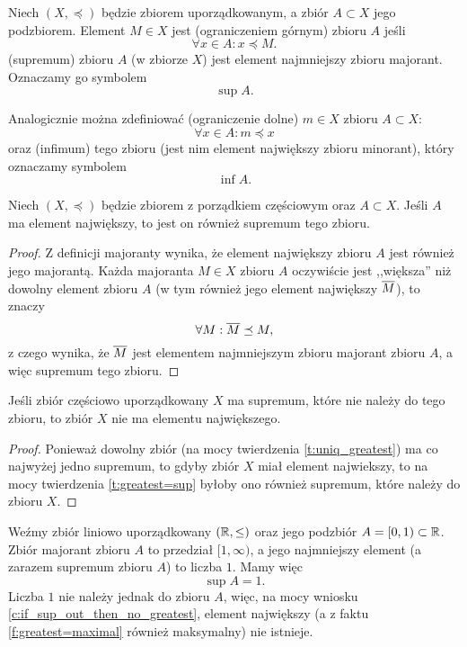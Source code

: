 \documentclass[11pt]{scrartcl}
\begin{document}
    Niech $(X, \preceq)$ będzie zbiorem uporządkowanym, a zbiór $A \subset X$ jego podzbiorem. Element $M \in X$ jest  (ograniczeniem górnym) zbioru $A$ jeśli
    $$ \forall x \in A : x \preceq M. $$
     (supremum) zbioru $A$ (w zbiorze $X$) jest element najmniejszy zbioru majorant. Oznaczamy go symbolem $$\sup A.$$

    \begin{remark}
        Analogicznie można zdefiniować  (ograniczenie dolne) $m \in X$ zbioru $A \subset X$:
        $$ \forall x \in A : m \preceq x $$
        oraz  (infimum) tego zbioru (jest nim element największy zbioru minorant), który oznaczamy symbolem $$\inf A.$$
    \end{remark}

    \begin{theorem}
        \label{t:greatest=sup}
        Niech $(X, \preceq)$ będzie zbiorem z porządkiem częściowym oraz $A \subset X$. Jeśli $A$ ma element największy, to jest on również supremum tego zbioru.
    \end{theorem}
    \begin{proof}
        Z definicji majoranty wynika, że element największy zbioru $A$ jest również jego majorantą. Każda majoranta $M \in X$ zbioru $A$ oczywiście jest ,,większa'' niż dowolny element zbioru $A$ (w tym również jego element największy $\overline{M}$), to znaczy
        $$ \forall M : \overline{M} \preceq M, $$
        z czego wynika, że $\overline{M}$ jest elementem najmniejszym zbioru majorant zbioru $A$, a więc supremum tego zbioru.
    \end{proof}

    \begin{corollary}
        \label{c:if_sup_out_then_no_greatest}
        Jeśli zbiór częściowo uporządkowany $X$ ma supremum, które nie należy do tego zbioru, to zbiór $X$ nie ma elementu największego.
    \end{corollary}
    \begin{proof}
        Ponieważ dowolny zbiór (na mocy twierdzenia \ref{t:uniq_greatest}) ma co najwyżej jedno supremum, to gdyby zbiór $X$ miał element najwiekszy, to na mocy twierdzenia \ref{t:greatest=sup} byłoby ono również supremum, które należy do zbioru $X$.
    \end{proof}

    \begin{example}
        Weźmy zbiór liniowo uporządkowany $(\mathbb R, \leq)$ oraz jego podzbiór $A = [0, 1) \subset \mathbb R$. Zbiór majorant zbioru $A$ to przedział $[1, \infty)$, a jego najmniejszy element (a zarazem supremum zbioru $A$) to liczba $1$. Mamy więc
        $$ \sup A = 1. $$
        Liczba $1$ nie należy jednak do zbioru $A$, więc, na mocy wniosku \ref{c:if_sup_out_then_no_greatest}, element największy (a z faktu \ref{f:greatest=maximal} również maksymalny) nie istnieje.
    \end{example}
\end{document}
